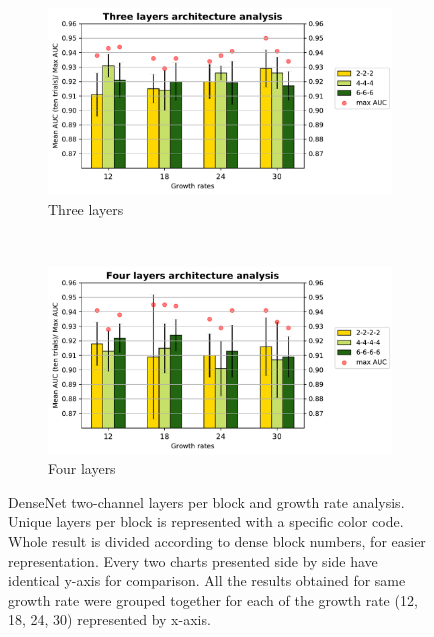 \begin{figure}
\begin{subfigure}[b]{7cm}
        \includegraphics[width=\textwidth]{images/densenet/simple/densenet_simple_three_layer_bar}
        \caption{Three layers }
        \label{fig:densenet_simple_three_layer_bar}
    \end{subfigure}
    ~ %
    \begin{subfigure}[b]{7cm}
        \includegraphics[width=\textwidth]{images/densenet/simple/densenet_simple_four_layer_bar}
        \caption{Four layers}
       \label{fig:densenet_simple_four_layer_bar}
    \end{subfigure} 
    \caption[DenseNet two-channel architecture analysis]{DenseNet two-channel layers per block and growth rate analysis. Unique layers per block is represented with a specific
    color code. Whole result is divided according to dense block numbers, for easier representation. Every two charts presented side by side have identical 
    y-axis for comparison. All the results obtained for same growth rate were grouped together for each of the growth rate (12, 18, 24, 30) represented by x-axis.}
    \label{fig:dense_arch_1}
\end{figure}  

